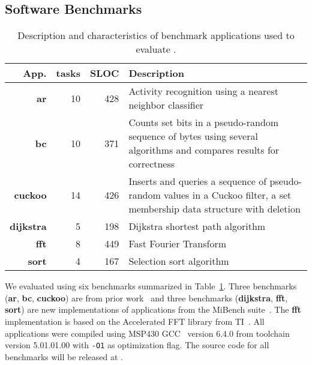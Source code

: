 \subsection{Software Benchmarks}
\label{sec:software_benchmarks}

\begin{table}
	\centering
	\footnotesize
	\begin{tabular}{| r|r|r | p{} |}
		\hline
		App.&tasks&SLOC&Description\\
		\hline\hline
        \textbf{ar} &10 &428 & Activity recognition using a nearest neighbor
classifier\\ %
		\hline
        \textbf{bc} &10 &371 & Counts set bits in a pseudo-random sequence of bytes
using several algorithms and compares results for correctness\\
		\hline
        \textbf{cuckoo} &14 &426 & Inserts and queries a sequence of pseudo-random
values in a Cuckoo filter, a set membership data structure with deletion\\
		\hline
        \textbf{dijkstra} &5 &198 & Dijkstra shortest path algorithm \\
		\hline
        \textbf{fft} &8 &449 & Fast Fourier Transform\\ %
		\hline
		\textbf{sort} &4 &167 & Selection sort algorithm\\
		\hline
	\end{tabular}
\caption{Description and characteristics of benchmark applications used to
evaluate \sys.}
\label{table:benchmark_table}
\end{table}

We evaluated \sys using six benchmarks summarized in
Table~\ref{table:benchmark_table}. %
Three benchmarks (\textbf{ar}, \textbf{bc}, \textbf{cuckoo}) are from prior
work~\cite{chain,alpaca} and three benchmarks (\textbf{dijkstra},
\textbf{fft}, \textbf{sort}) are new implementations of applications
from the MiBench suite~\cite{mibench,hicks_mibench2_2016}. The
\textbf{fft} implementation is based on the Accelerated FFT library from
TI~\cite{ti_dsp}. All applications were compiled using MSP430 GCC~\cite{ti-gcc} version 6.4.0
from toolchain version 5.01.01.00 with \texttt{-O1} as optimization flag.
%
The source code for all benchmarks will be released at \cite{coala_website}.


